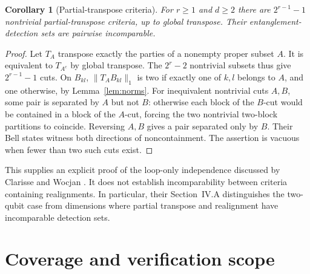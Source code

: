 \documentclass[11pt]{article}
\newtheorem{corollary}[theorem]{Corollary}
\newcommand{\norm}[1]{\lVert #1\rVert}
\begin{document}
\begin{corollary}[Partial-transpose criteria]\label{cor:cuts}
For $r\geq1$ and $d\geq2$ there are $2^{r-1}-1$ nontrivial
partial-transpose criteria, up to global transpose. Their
entanglement-detection sets are pairwise incomparable.
\end{corollary}
\begin{proof}
Let $T_A$ transpose exactly the parties of a nonempty proper subset
$A$. It is equivalent to $T_{A^c}$ by global transpose.
The $2^r-2$ nontrivial subsets thus give $2^{r-1}-1$ cuts.
On $B_{kl}$, $\norm{T_A B_{kl}}_1$ is two if exactly one of $k,l$
belongs to $A$, and one otherwise, by Lemma~\ref{lem:norms}.
For inequivalent nontrivial cuts $A,B$, some pair is separated by
$A$ but not $B$: otherwise each block of the $B$-cut would be contained
in a block of the $A$-cut, forcing the two nontrivial two-block
partitions to coincide. Reversing $A,B$ gives a pair separated only
by $B$. Their Bell states witness both directions of noncontainment.
The assertion is vacuous when fewer than two such cuts exist.
\end{proof}
This supplies an explicit proof of the loop-only independence discussed
by Clarisse and Wocjan \cite[Section~V, p.~6]{CW}. It does not establish
incomparability between criteria containing realignments. In particular,
their Section~IV.A distinguishes the two-qubit case from dimensions
where partial transpose and realignment have incomparable detection sets.

\section{Coverage and verification scope}
\end{document}

